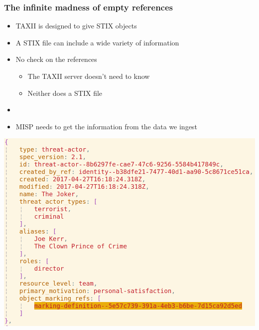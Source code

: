\begin{frame}
\begin{minipage}{0.3\textwidth}
    \end{minipage}
\end{frame}

\begin{frame}
    \frametitle{The infinite madness of empty references}
    \begin{minipage}{0.5\textwidth}
        \begin{itemize}
            \item TAXII is designed to give STIX objects
            \item A STIX file can include a wide variety of information
            \item No check on the references
            \begin{itemize}
                \item The TAXII server doesn't need to know
                \item Neither does a STIX file
            \end{itemize}
            \item []
            \item MISP needs to get the information from the data we ingest
        \end{itemize}
    \end{minipage}%
    \begin{minipage}{0.5\textwidth}
        \includegraphics[scale=0.25]{images/missing_reference.png}
    \end{minipage}
\end{frame}

